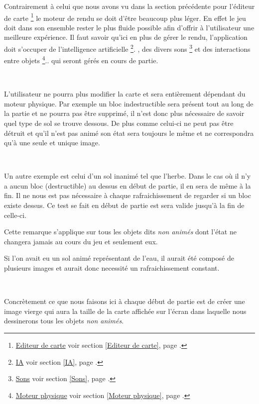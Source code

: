 			Contrairement à celui que nous avons vu dans la section précédente pour
			l'éditeur de carte
			\footnote{
				\hyperlink{Editeur de carte}{Editeur de carte}
				\og voir section \ref{Editeur de carte}, page \pageref{Editeur de carte}.\fg
			}
			le moteur de rendu se doit d'être beaucoup plus léger. En effet le jeu doit
			dans son ensemble rester le plus fluide possible afin d'offrir à l'utilisateur une meilleure
			expérience. Il faut savoir qu'ici en plus de gérer le rendu, l'application
			doit s'occuper de l'intelligence artificielle
			\footnote{
				\hyperlink{IA}{IA}
				\og voir section \ref{IA}, page \pageref{IA}.\fg
			}.
			, des divers sons
			\footnote{
				\hyperlink{Sons}{Sons}
				\og voir section \ref{Sons}, page \pageref{Sons}.\fg
			} et des interactions entre objets
			 \footnote{
				\hyperlink{Moteur physique}{Moteur physique}
				\og voir section \ref{Moteur physique}, page \pageref{Moteur physique}.\fg
			}..
			qui seront gérés en cours de partie.		
			
			$\,$	
			
			L'utilisateur ne pourra plus modifier la carte et sera
			entièrement dépendant du moteur physique\footnotemark[3]. Par
			exemple un bloc indestructible sera présent tout au long de la
			partie et ne pourra pas être supprimé, il n'est donc plus nécessaire de
			savoir quel type de sol se trouve dessous. De plus comme celui-ci ne peut pas
			être détruit et qu'il n'est pas animé son état sera toujours le même et ne
			correspondra qu'à une seule et unique image.
			
			$\,$			
			
			Un autre exemple est celui d'un sol inanimé tel que l'herbe. Dans le cas où
			il n'y a aucun bloc (destructible) au dessus en début de partie, il en sera
			de même à la fin. Il ne nous est pas nécessaire à chaque
			rafraichissement de regarder si un bloc existe dessus. Ce test se fait en
			début de partie est sera valide jusqu'à la fin de celle-ci.
			
			
			Cette remarque s'applique sur tous les objets dits \emph{non animés} dont
			l'état ne changera jamais au cours du jeu et seulement eux.
			
			
			Si l'on avait eu un sol animé représentant de l'eau, il aurait été composé de
			plusieurs images et aurait donc necessité un rafraichissement constant.

			$\,$
			
			Concrètement ce que nous faisons ici à chaque début de partie est de créer
			une image vierge qui aura la taille de la carte affichée sur l'écran dans
			laquelle nous dessinerons tous les objets \emph{non animés}.
			
